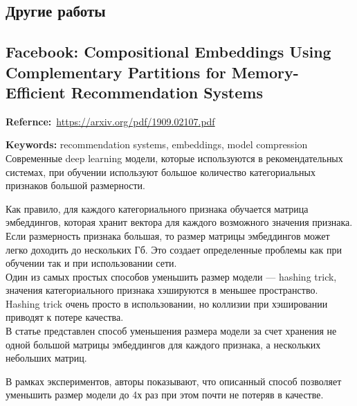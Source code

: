 \begin{bibunit}[plainnat]






\chapter{Другие работы}

\section*{Facebook: Compositional Embeddings Using Complementary Partitions for Memory-Efficient Recommendation Systems}

\textbf{Refernce:}~\url{https://arxiv.org/pdf/1909.02107.pdf}

\textbf{Keywords:} recommendation systems, embeddings, model compression \\

Современные deep learning модели, которые используются в рекомендательных системах, при обучении используют большое количество категориальных признаков большой размерности. 

Как правило, для каждого категориального признака обучается матрица эмбеддингов, которая хранит вектора для каждого возможного значения признака. \\

Если размерность признака большая, то размер матрицы эмбеддингов может легко доходить до нескольких Гб. Это создает определенные проблемы как при обучении так и при использовании сети. \\

Один из самых простых способов уменьшить размер модели --- hashing trick, значения категориального признака хэшируются в меньшее пространство. Hashing trick очень просто в использовании, но коллизии при хэшировании приводят к потере качества. \\

В статье представлен способ уменьшения размера модели за счет хранения не одной большой матрицы эмбеддингов для каждого признака, а нескольких небольших матриц.

В рамках экспериментов, авторы показывают, что описанный способ позволяет уменьшить размер модели до 4х раз при этом почти не потеряв в качестве.


\end{bibunit}
